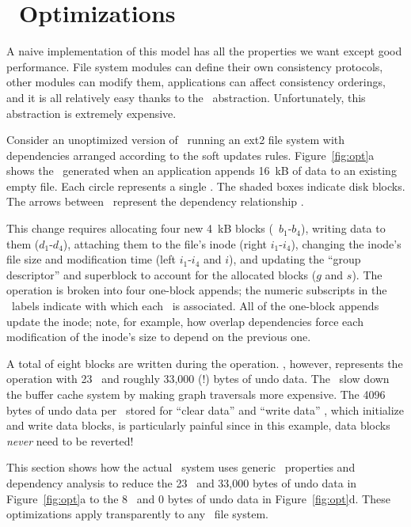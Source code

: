 
\section{\Patch\ Optimizations}
\label{sec:patch:optimizations}

A naive implementation of this model has all the properties we want except
good performance.
%
File system modules can define their own consistency protocols, other
modules can modify them,
%
applications can affect consistency orderings, and it is all relatively
easy thanks to the \patch\ abstraction.
%
Unfortunately, this abstraction is extremely expensive.


Consider an unoptimized version of \Kudos\ running an ext2 file system with
dependencies arranged according to the soft updates rules.
%
Figure~\ref{fig:opt}a shows the \patches\ generated when an application appends
16~kB of data to an existing empty file.
%
Each circle represents a single \patch. The shaded boxes indicate disk blocks.
%
The arrows between \patches\ represent the dependency relationship \PDDepend.

This change requires allocating four new 4~kB blocks (\patches\ $b_1$-$b_4$),
writing data to them ($d_1$-$d_4$), attaching them to the file's inode (right
$i_1$-$i_4$), changing the inode's file size and modification time (left
$i_1$-$i_4$ and $i$), and updating the ``group descriptor'' and superblock to
account for the allocated blocks ($g$ and $s$).
%
The operation is broken into four one-block appends; the numeric subscripts in
the \patch\ labels indicate with which each \patch\ is associated.
%
All of the one-block appends update the inode; note, for example, how overlap
dependencies force each modification of the inode's size to depend on the
previous one.

A total of eight blocks are written during the operation.
%
\Kudos, however, represents the operation with 23 \patches\ and roughly 33,000
(!) bytes of undo data.
%
The \patches\ slow down the buffer cache system by making graph traversals
more expensive.
%
The 4096 bytes of undo data per \patch\ stored for ``clear data'' and
``write data'' \patches, which initialize and write data blocks, is
particularly painful since in this example, data blocks \emph{never}
need to be reverted!


This section shows how the actual \Kudos\ system uses generic \patch\
properties and dependency analysis to reduce the 23 \patches\ and 33,000 bytes
of undo data in Figure~\ref{fig:opt}a to the 8 \patches\ and 0 bytes of
undo data in Figure~\ref{fig:opt}d.
%
These optimizations apply transparently to any \Kudos\ file system.


